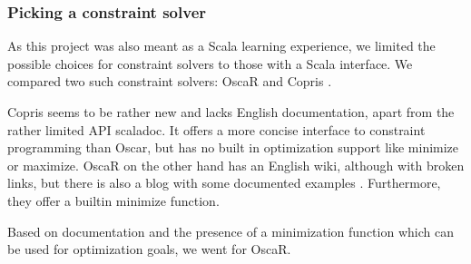\documentclass[a4paper]{article}
\begin{document}

\subsubsection{Picking a constraint solver}
As this project was also meant as a Scala learning experience, 
we limited the possible choices for constraint solvers to those with a Scala interface.
We compared two such constraint solvers: OscaR \cite{oscar} and Copris \cite{copris}.

Copris seems to be rather new and lacks English documentation, apart from the rather limited API scaladoc.
It offers a more concise interface to constraint programming than Oscar, but has no built in optimization support like minimize or maximize.
OscaR on the other hand has an English wiki, although with broken links, but there is also a blog with some documented examples \cite{hakank}.
Furthermore, they offer a builtin minimize function.

Based on documentation and the presence of a minimization function which can be used for optimization goals, we went for OscaR.

\end{document}
